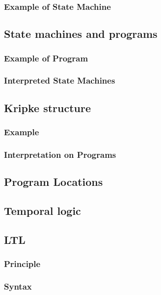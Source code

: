 \documentclass[12pt, a4paper]{book}
\begin{document}
  \subsubsection{Example of State Machine}
  \label{subs:Example of State Machine}
  \subsection{State machines and programs}
  \label{sub:State machines and programs}
  \subsubsection{Example of Program}
  \label{subs:Example of Program}
  \subsubsection{Interpreted State Machines}
  \label{subs:Interpreted State Machines}
  \subsection{Kripke structure}
  \label{sub:Kripke structure}
  \subsubsection{Example}
  \label{subs:Example}
  \subsubsection{Interpretation on Programs}
  \label{subs:Interpretation on Programs}
  \subsection{Program Locations}
  \label{sub:Program Locations}
  \subsection{Temporal logic}
  \label{sub:Temporal logic}
  \subsection{LTL}
  \label{sub:LTL}
  \subsubsection{Principle}
  \label{subs:Principle}
  \subsubsection{Syntax}
  \label{subs:Syntax}
\end{document}
